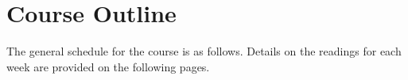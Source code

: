 \documentclass[12pt,a4paper]{article}
\begin{document}
\clearpage
\section{Course Outline}
The general schedule for the course is as follows. Details on the readings for each week are provided on the following pages.
\secttoc
\clearpage

\subsection{}





\end{document}
